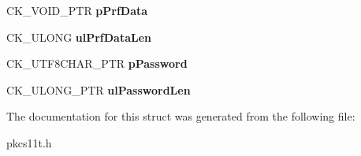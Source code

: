 \begin{DoxyCompactItemize}
C\+K\+\_\+\+V\+O\+I\+D\+\_\+\+P\+TR {\bfseries p\+Prf\+Data}
\item 
\mbox{\label{struct_c_k___p_k_c_s5___p_b_k_d2___p_a_r_a_m_s_a5e835d20bdcc45dd218753b40aec7d6b}} 
C\+K\+\_\+\+U\+L\+O\+NG {\bfseries ul\+Prf\+Data\+Len}
\item 
\mbox{\label{struct_c_k___p_k_c_s5___p_b_k_d2___p_a_r_a_m_s_a19326715c9a2b4896529cae3ca5cdd12}} 
C\+K\+\_\+\+U\+T\+F8\+C\+H\+A\+R\+\_\+\+P\+TR {\bfseries p\+Password}
\item 
\mbox{\label{struct_c_k___p_k_c_s5___p_b_k_d2___p_a_r_a_m_s_a26b94cdd7ed68afb00f08a32eaf1ec18}} 
C\+K\+\_\+\+U\+L\+O\+N\+G\+\_\+\+P\+TR {\bfseries ul\+Password\+Len}
\end{DoxyCompactItemize}


The documentation for this struct was generated from the following file\+:\begin{DoxyCompactItemize}
\item 
pkcs11t.\+h\end{DoxyCompactItemize}
